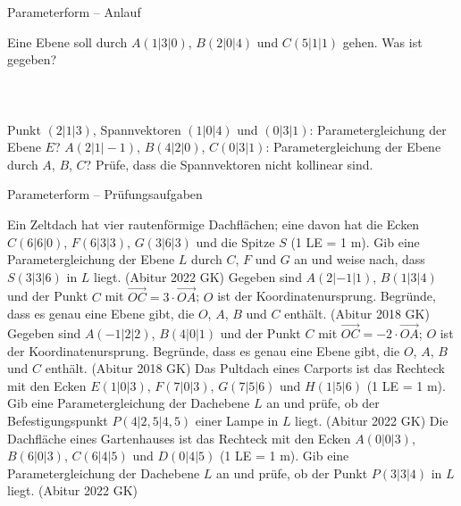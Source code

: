 \setcounter{aufgabe}{36}

\begin{aufgabe}{Parameterform – Anlauf}
\begin{teile}
\teil Eine Ebene soll durch $A(1 | 3 | 0)$, $B(2 | 0 | 4)$ und $C(5 | 1 | 1)$ gehen. Was ist gegeben? \\  \\  \\  \\ 
\teil Punkt $(2 | 1 | 3)$, Spannvektoren $(1 | 0 | 4)$ und $(0 | 3 | 1)$: Parametergleichung der Ebene $E$?
\teil $A(2 | 1 | -1)$, $B(4 | 2 | 0)$, $C(0 | 3 | 1)$: Parametergleichung der Ebene durch $A$, $B$, $C$? Prüfe, dass die Spannvektoren nicht kollinear sind.
\end{teile}
\end{aufgabe}

\begin{aufgabe}{Parameterform – Prüfungsaufgaben}
\begin{teile}
\teil Ein Zeltdach hat vier rautenförmige Dachflächen; eine davon hat die Ecken $C(6 | 6 | 0)$, $F(6 | 3 | 3)$, $G(3 | 6 | 3)$ und die Spitze $S$ (1 LE = 1 m). Gib eine Parametergleichung der Ebene $L$ durch $C$, $F$ und $G$ an und weise nach, dass $S(3 | 3 | 6)$ in $L$ liegt. \hfill (Abitur 2022 GK)
\teil Gegeben sind $A(2 | -1 | 1)$, $B(1 | 3 | 4)$ und der Punkt $C$ mit $\overrightarrow{OC} = 3 \cdot \overrightarrow{OA}$; $O$ ist der Koordinatenursprung. Begründe, dass es genau eine Ebene gibt, die $O$, $A$, $B$ und $C$ enthält. \hfill (Abitur 2018 GK)
\teil Gegeben sind $A(-1 | 2 | 2)$, $B(4 | 0 | 1)$ und der Punkt $C$ mit $\overrightarrow{OC} = -2 \cdot \overrightarrow{OA}$; $O$ ist der Koordinatenursprung. Begründe, dass es genau eine Ebene gibt, die $O$, $A$, $B$ und $C$ enthält. \hfill (Abitur 2018 GK)
\teil Das Pultdach eines Carports ist das Rechteck mit den Ecken $E(1 | 0 | 3)$, $F(7 | 0 | 3)$, $G(7 | 5 | 6)$ und $H(1 | 5 | 6)$ (1 LE = 1 m). Gib eine Parametergleichung der Dachebene $L$ an und prüfe, ob der Befestigungspunkt $P(4 | 2{,}5 | 4{,}5)$ einer Lampe in $L$ liegt. \hfill (Abitur 2022 GK)
\teil Die Dachfläche eines Gartenhauses ist das Rechteck mit den Ecken $A(0 | 0 | 3)$, $B(6 | 0 | 3)$, $C(6 | 4 | 5)$ und $D(0 | 4 | 5)$ (1 LE = 1 m). Gib eine Parametergleichung der Dachebene $L$ an und prüfe, ob der Punkt $P(3 | 3 | 4)$ in $L$ liegt. \hfill (Abitur 2022 GK)
\end{teile}
\end{aufgabe}

